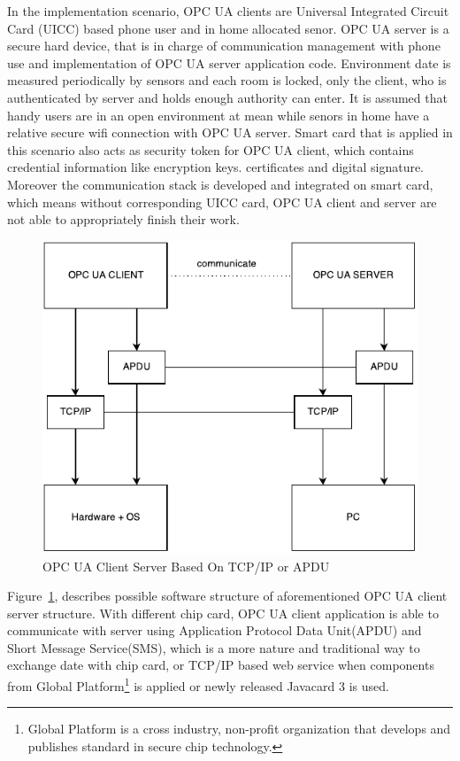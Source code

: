\documentclass[]{llncs}
\begin{document}
In the implementation scenario, OPC UA clients are Universal Integrated Circuit Card (UICC)  based phone user and in home allocated senor. OPC UA server is a secure hard device, that is in charge of communication management with phone use and implementation of OPC UA server application code. Environment date is measured periodically by sensors and each room is locked, only the client, who is authenticated by server and holds enough authority can enter. It is assumed that handy users are in an open environment at mean while senors in home have a relative secure wifi connection with OPC UA server. Smart card that is applied in this scenario also acts as security token for OPC UA client, which contains credential information like encryption keys. certificates and digital signature. Moreover the communication stack is developed and integrated on smart card, which means without corresponding UICC card, OPC UA client and server are not able to appropriately finish their work.
 \begin{figure}[ht]

	\centering
	\includegraphics[width=1\textwidth]{softwareStructure}
		\caption[ ]{OPC UA Client Server Based On TCP/IP or APDU}
	\label{fig:softwareStructure}
\end{figure}

Figure~\ref{fig:softwareStructure}, describes possible software structure of aforementioned OPC UA client server structure. With different chip card, OPC UA client application is able to communicate with server using Application Protocol Data Unit(APDU) and Short Message Service(SMS), which is a more nature and traditional way to exchange date with chip card, or TCP/IP based web service when components from Global Platform\footnote{Global Platform is a cross industry, non-profit organization that develops and publishes standard in secure chip technology.} is applied or newly released Javacard 3 is used.  
\end{document}
